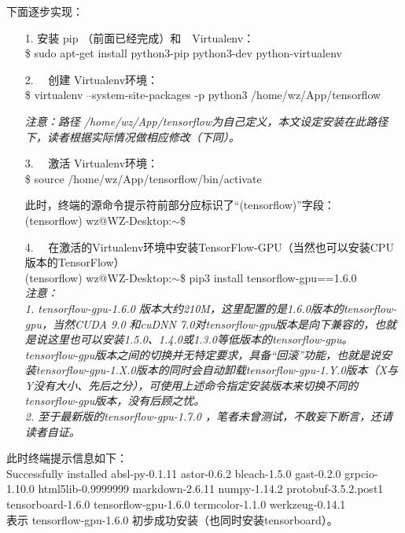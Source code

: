 \documentclass[11pt,a4paper]{ctexart}
\begin{document}
下面逐步实现：
\vspace{-0.2cm}
\begin{itemize}
\item[1.] 安装 pip （前面已经完成）和　Virtualenv：\\
\$ sudo apt-get install python3-pip python3-dev python-virtualenv

\item[2.]　创建 Virtualenv环境：\\
\$ virtualenv --system-site-packages -p python3 /home/wz/App/tensorflow

{ \color{red}\emph{注意：路径 /home/wz/App/tensorflow为自己定义，本文设定安装在此路径下，读者根据实际情况做相应修改（下同）。}}
\item[3.]　激活 Virtualenv环境\label{activate}：\\
\$ source /home/wz/App/tensorflow/bin/activate

此时，终端的源命令提示符前部分应标识了“(tensorflow)”字段：\\
 (tensorflow) wz@WZ-Desktop:$\sim$\$ 

\item[4.]　在激活的Virtualenv环境中安装TensorFlow-GPU（当然也可以安装CPU版本的TensorFlow）\\
(tensorflow) wz@WZ-Desktop:$\sim$\$  pip3 install tensorflow-gpu==1.6.0\\
{ \color{red}\emph{注意：\\
1. tensorflow-gpu-1.6.0 版本大约210M，这里配置的是1.6.0版本的tensorflow-gpu，当然CUDA 9.0 和cuDNN 7.0对tensorflow-gpu版本是向下兼容的，也就是说这里也可以安装1.5.0、1.4.0或1.3.0等低版本的tensorflow-gpu。tensorflow-gpu版本之间的切换并无特定要求，具备“回滚”功能，也就是说安装tensorflow-gpu-1.X.0版本的同时会自动卸载tensorflow-gpu-1.Y.0版本（X与Y没有大小、先后之分），可使用上述命令指定安装版本来切换不同的tensorflow-gpu版本，没有后顾之忧。\\
2. 至于最新版的tensorflow-gpu-1.7.0 ，笔者未曾测试，不敢妄下断言，还请读者自证。}}

\end{itemize}

此时终端提示信息如下：\\
Successfully installed absl-py-0.1.11 astor-0.6.2 bleach-1.5.0 gast-0.2.0 grpcio-1.10.0 html5lib-0.9999999 markdown-2.6.11 numpy-1.14.2 protobuf-3.5.2.post1 tensorboard-1.6.0 tensorflow-gpu-1.6.0 termcolor-1.1.0 werkzeug-0.14.1\\
表示 tensorflow-gpu-1.6.0 初步成功安装（也同时安装tensorboard）。
\end{document}

